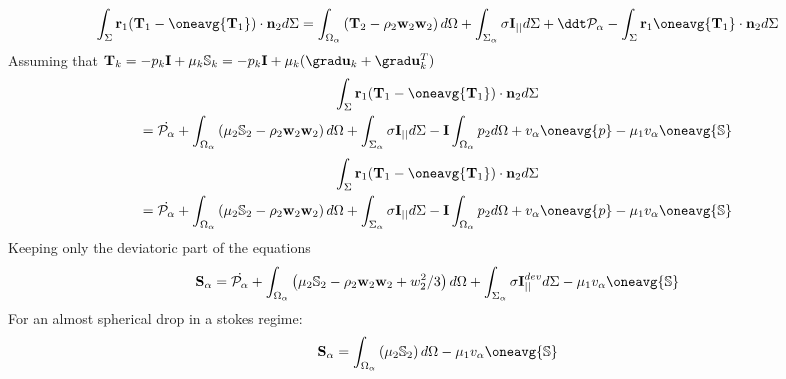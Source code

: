 \begin{equation}
    \int_{\Sigma}\textbf{r}_1 (\textbf{T}_1  -  \oneavg{\textbf{T}_1}) \cdot \textbf{n}_2 d\Sigma
    = \int_{\Omega_\alpha} \left(
        \mathbf{T}_2
        - \rho_2  \textbf{w}_2 \textbf{w}_2 
    \right) d\Omega
     + \int_{\Sigma_\alpha} 
     \sigma \textbf{I}_{||}
    d\Sigma
    + \ddt \mathcal{P}_\alpha
    -\int_{\Sigma}\textbf{r}_1   \oneavg{\textbf{T}_1} \cdot \textbf{n}_2 d\Sigma
\end{equation}
Assuming that $\textbf{T}_k = - p_k \textbf{I} + \mu_k \mathbb{S}_k  = -p_k \textbf{I} + \mu_k (\grad \textbf{u}_k + \grad \textbf{u}_k^T )$ 
\begin{multline}
    \int_{\Sigma}\textbf{r}_1 (\textbf{T}_1  -  \oneavg{\textbf{T}_1}) \cdot \textbf{n}_2 d\Sigma
    \\= \dot{ \mathcal{P}_\alpha}
    + \int_{\Omega_\alpha} \left(
        \mu_2\mathbb{S}_2
        - \rho_2  \textbf{w}_2 \textbf{w}_2 
    \right) d\Omega
     + \int_{\Sigma_\alpha} 
     \sigma \textbf{I}_{||}
    d\Sigma
    - \textbf{I} \int_{\Omega_\alpha} p_2 d\Omega
    + v_\alpha \oneavg{p}
    - \mu_1 v_\alpha \oneavg{\mathbb S}
\end{multline}
\begin{multline}
    \int_{\Sigma}\textbf{r}_1 (\textbf{T}_1  -  \oneavg{\textbf{T}_1}) \cdot \textbf{n}_2 d\Sigma
    \\= \dot{ \mathcal{P}_\alpha}
    + \int_{\Omega_\alpha} \left(
        \mu_2\mathbb{S}_2
        - \rho_2  \textbf{w}_2 \textbf{w}_2 
    \right) d\Omega
     + \int_{\Sigma_\alpha} 
     \sigma \textbf{I}_{||}
    d\Sigma
    - \textbf{I} \int_{\Omega_\alpha} p_2 d\Omega
    + v_\alpha \oneavg{p}
    - \mu_1 v_\alpha \oneavg{\mathbb S}
\end{multline}
Keeping only  the deviatoric part of the equations
\begin{equation}
    \textbf{S}_\alpha
    = \dot{ \mathcal{P}_\alpha}
    + \int_{\Omega_\alpha} \left(
        \mu_2\mathbb{S}_2
        - \rho_2  \textbf{w}_2 \textbf{w}_2 + w^2_2/3
    \right) d\Omega
     + \int_{\Sigma_\alpha} 
     \sigma \textbf{I}_{||}^{dev}
    d\Sigma
    - \mu_1 v_\alpha \oneavg{\mathbb S}
\end{equation}
For an almost spherical drop in a stokes regime: 
\begin{equation}
    \textbf{S}_\alpha
    = 
    \int_{\Omega_\alpha} \left(
        \mu_2\mathbb{S}_2
    \right) d\Omega
    - \mu_1 v_\alpha \oneavg{\mathbb S}
\end{equation}
 
